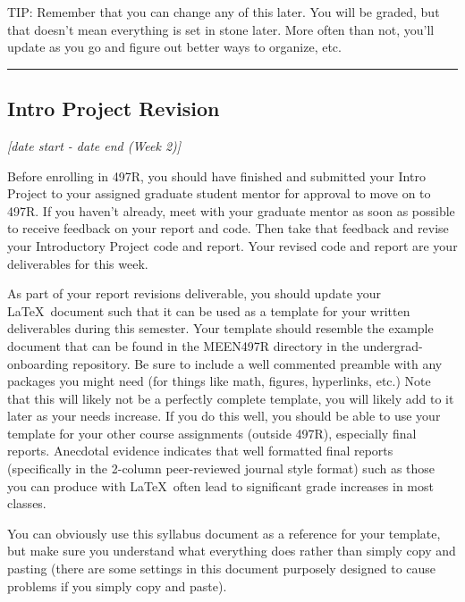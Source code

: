 \documentclass[12pt]{article}
\begin{document}
\noindent TIP:  Remember that you can change any of this later.
You will be graded, but that doesn't mean everything is set in stone later. 
More often than not, you'll update as you go and figure out better ways to organize, etc.



\vspace{1em}\hrule\vspace{1em}
\subsection{Intro Project Revision}
\label{ssec:ipr}

\textit{[date start - date end (Week 2)]}
 
\bigskip
 
Before enrolling in 497R, you should have finished and submitted your Intro Project to your assigned graduate student mentor for approval to move on to 497R.
If you haven't already, meet with your graduate mentor as soon as possible to receive feedback on your report and code.  Then take that feedback and revise your Introductory Project code and report.  Your revised code and report are your deliverables for this week.

As part of your report revisions deliverable, you should update your \LaTeX~document such that it can be used as a template for your written deliverables during this semester.
Your template should resemble the example document that can be found in the MEEN497R directory in the undergrad-onboarding repository.
Be sure to include a well commented preamble with any packages you might need (for things like math, figures, hyperlinks, etc.)
Note that this will likely not be a perfectly complete template, you will likely add to it later as your needs increase.  If you do this well, you should be able to use your template for your other course assignments (outside 497R), especially final reports.  Anecdotal evidence indicates that well formatted final reports (specifically in the 2-column peer-reviewed journal style format) such as those you can produce with \LaTeX~often lead to significant grade increases in most classes.

You can obviously use this syllabus document as a reference for your template, but make sure you understand what everything does rather than simply copy and pasting (there are some settings in this document purposely designed to cause problems if you simply copy and paste).
\end{document}
